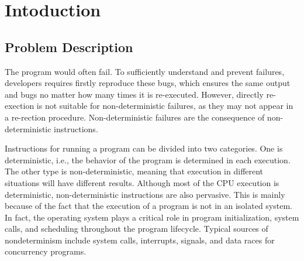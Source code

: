 \section{Intoduction}



\subsection{Problem Description}

The program would often fail. To sufficiently understand and prevent failures,
developers requires firstly reproduce these bugs, which ensures the same output
and bugs no matter how many times it is re-executed. However, directly
re-exection is not suitable for non-deterministic failures, as they may not
appear in a re-rection procedure. Non-deterministic failures are the consequence
of non-deterministic instructions. 

Instructions for running a program can be divided into two categories. One is
deterministic, i.e., the behavior of the program is determined in each
execution. The other type is non-deterministic, meaning that execution in
different situations will have different results. Although most of the CPU
execution is deterministic, non-deterministic instructions are also pervasive.
This is mainly because of the fact that the execution of a program is not in an
isolated system. In fact, the operating system plays a critical role in program
initialization, system calls, and scheduling throughout the program lifecycle.
Typical sources of nondeterminism include system calls, interrupts, signals, and
data races for concurrency programs.

